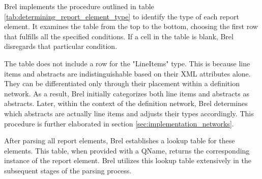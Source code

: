


Brel implements the procedure outlined in table \ref{tab:determining_report_element_type} to identify the type of each report element.
It examines the table from the top to the bottom, choosing the first row that fulfills all the specified conditions.
If a cell in the table is blank, Brel disregards that particular condition.

The table does not include a row for the "LineItems" type.
This is because line items and abstracts are indistinguishable based on their XML attributes alone.
They can be differentiated only through their placement within a definition network.
As a result, Brel initially categorizes both line items and abstracts as abstracts.
Later, within the context of the definition network, Brel determines which abstracts are actually line items and adjusts their types accordingly.
This procedure is further elaborated in section \ref{sec:implementation_networks}.

After parsing all report elements, Brel establishes a lookup table for these elements.
This table, when provided with a QName, returns the corresponding instance of the report element.
Brel utilizes this lookup table extensively in the subsequent stages of the parsing process.


